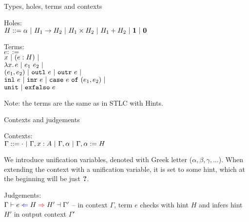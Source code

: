 \documentclass{beamer}
\begin{document}
\begin{frame}{Types, holes, terms and contexts}

Holes: \\
$H ::= \alpha \ |\  H_1 \to H_2 \ |\  H_1 \times H_2 \ |\  H_1 + H_2 \ |\  \textbf{1} \ |\  \textbf{0}$

\vspace{2em}

Terms: \\
$e ::=$ \\
\qquad $x \ |\  (e : H) \ |\  $ \\
\qquad $\lambda x.\, e \ |\  e_1\ e_2 \ |\ $ \\
\qquad $(e_1, e_2) \ |\  \texttt{outl}\ e \ |\  \texttt{outr}\ e \ |\ $ \\
\qquad $\texttt{inl}\ e \ |\  \texttt{inr}\ e \ |\  \texttt{case}\ e\ \texttt{of}\ (e_1, e_2) \ |\ $ \\
\qquad $\texttt{unit} \ |\  \texttt{exfalso}\ e$

\vspace{2em}

Note: the terms are the same as in STLC with Hints.

\end{frame}

\begin{frame}{Contexts and judgements}

Contexts: \\
$\Gamma ::= \cdot \ |\  \Gamma, x : A \ |\  \Gamma, \alpha \ |\  \Gamma, \alpha := H$

\vspace{2em}

We introduce unification variables, denoted with Greek letter ($\alpha, \beta, \gamma, \dots$). When extending the context with a unification variable, it is set to some hint, which at the beginning will be just $\textbf{?}$.

\vspace{2em}

Judgements: \\
$\fulluniftyping{\Gamma}{e}{H}{H'}{\Gamma'}$ -- in context $\Gamma$, term $e$ checks with hint $H$ and infers hint $H'$ in output context $\Gamma'$

\end{frame}
\end{document}
